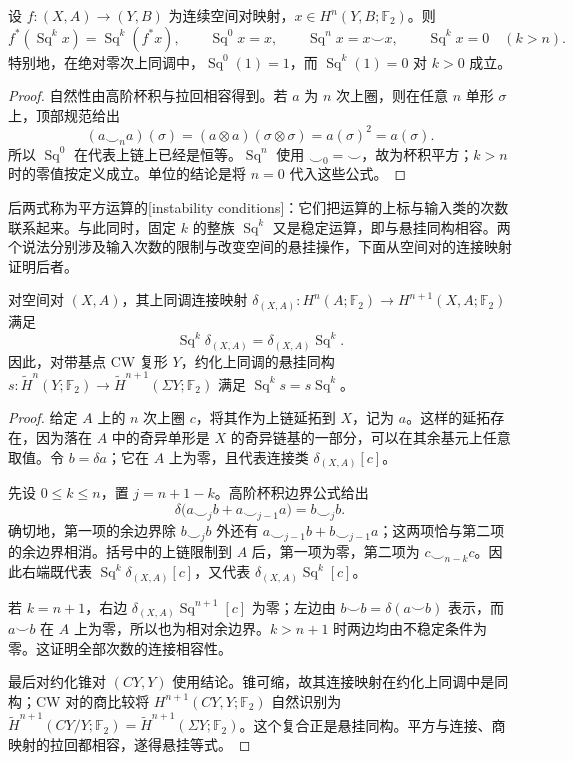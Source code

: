 \begin{proposition}\label{g2:prop:squares-basic-properties}
	设 \(f:(X,A)\to(Y,B)\) 为连续空间对映射，\(x\in H^n(Y,B;\mathbb F_2)\)。则
	\[
		f^*(\operatorname{Sq}^k x)=\operatorname{Sq}^k(f^*x),\qquad
		\operatorname{Sq}^0x=x,\qquad
		\operatorname{Sq}^n x=x\smile x,\qquad
		\operatorname{Sq}^k x=0\quad(k>n).
	\]
	特别地，在绝对零次上同调中，\(\operatorname{Sq}^0(1)=1\)，而 \(\operatorname{Sq}^k(1)=0\) 对 \(k>0\) 成立。
\end{proposition}
\begin{proof}
	自然性由高阶杯积与拉回相容得到。若 \(a\) 为 \(n\) 次上圈，则在任意 \(n\) 单形 \(\sigma\) 上，顶部规范给出
	\[
		(a\smile_n a)(\sigma)=(a\otimes a)(\sigma\otimes\sigma)=a(\sigma)^2=a(\sigma).
	\]
	所以 \(\operatorname{Sq}^0\) 在代表上链上已经是恒等。\(\operatorname{Sq}^n\) 使用 \(\smile_0=\smile\)，故为杯积平方；\(k>n\) 时的零值按定义成立。单位的结论是将 \(n=0\) 代入这些公式。
\end{proof}

后两式称为平方运算的[instability conditions]：它们把运算的上标与输入类的次数联系起来。与此同时，固定 \(k\) 的整族 \(\operatorname{Sq}^k\) 又是稳定运算，即与悬挂同构相容。两个说法分别涉及输入次数的限制与改变空间的悬挂操作，下面从空间对的连接映射证明后者。

\begin{proposition}\label{g2:prop:squares-connecting-suspension}
	对空间对 \((X,A)\)，其上同调连接映射 \(\delta_{(X,A)}:H^n(A;\mathbb F_2)\to H^{n+1}(X,A;\mathbb F_2)\) 满足
	\[
		\operatorname{Sq}^k\delta_{(X,A)}=\delta_{(X,A)}\operatorname{Sq}^k.
	\]
	因此，对带基点 CW 复形 \(Y\)，约化上同调的悬挂同构 \(s:\widetilde H^n(Y;\mathbb F_2)\to\widetilde H^{n+1}(\Sigma Y;\mathbb F_2)\) 满足 \(\operatorname{Sq}^k s=s\operatorname{Sq}^k\)。
\end{proposition}
\begin{proof}
	给定 \(A\) 上的 \(n\) 次上圈 \(c\)，将其作为上链延拓到 \(X\)，记为 \(a\)。这样的延拓存在，因为落在 \(A\) 中的奇异单形是 \(X\) 的奇异链基的一部分，可以在其余基元上任意取值。令 \(b=\delta a\)；它在 \(A\) 上为零，且代表连接类 \(\delta_{(X,A)}[c]\)。

	先设 \(0\le k\le n\)，置 \(j=n+1-k\)。高阶杯积边界公式给出
	\[
		\delta\bigl(a\smile_j b+a\smile_{j-1}a\bigr)=b\smile_j b.
	\]
	确切地，第一项的余边界除 \(b\smile_j b\) 外还有 \(a\smile_{j-1}b+b\smile_{j-1}a\)；这两项恰与第二项的余边界相消。括号中的上链限制到 \(A\) 后，第一项为零，第二项为 \(c\smile_{n-k}c\)。因此右端既代表 \(\operatorname{Sq}^k\delta_{(X,A)}[c]\)，又代表 \(\delta_{(X,A)}\operatorname{Sq}^k[c]\)。

	若 \(k=n+1\)，右边 \(\delta_{(X,A)}\operatorname{Sq}^{n+1}[c]\) 为零；左边由 \(b\smile b=\delta(a\smile b)\) 表示，而 \(a\smile b\) 在 \(A\) 上为零，所以也为相对余边界。\(k>n+1\) 时两边均由不稳定条件为零。这证明全部次数的连接相容性。

	最后对约化锥对 \((CY,Y)\) 使用结论。锥可缩，故其连接映射在约化上同调中是同构；CW 对的商比较将 \(H^{n+1}(CY,Y;\mathbb F_2)\) 自然识别为 \(\widetilde H^{n+1}(CY/Y;\mathbb F_2)=\widetilde H^{n+1}(\Sigma Y;\mathbb F_2)\)。这个复合正是悬挂同构。平方与连接、商映射的拉回都相容，遂得悬挂等式。
\end{proof}

